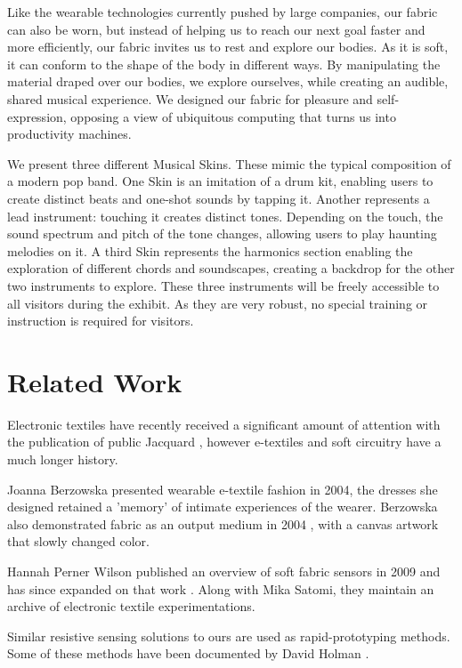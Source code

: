 \documentclass{sigchi-ext}
\begin{document}
Like the wearable technologies currently pushed by large companies, our fabric can also be worn, but instead of helping us to reach our next goal faster and more efficiently, our fabric invites us to rest and explore our bodies. As it is soft, it can conform to the shape of the body in different ways. By manipulating the material draped over our bodies, we explore ourselves, while creating an audible, shared musical experience. We designed our fabric for pleasure and self-expression, opposing a view of ubiquitous computing that turns us into productivity machines.

We present three different Musical Skins. These mimic the typical composition of a modern pop band. One Skin is an imitation of a drum kit, enabling users to create distinct beats and one-shot sounds by tapping it. Another represents a lead instrument: touching it creates distinct tones. Depending on the touch, the sound spectrum and pitch of the tone changes, allowing users to play haunting melodies on it. A third Skin represents the harmonics section enabling the exploration of different chords and soundscapes, creating a backdrop for the other two instruments to explore. These three instruments will be freely accessible to all visitors during the exhibit. As they are very robust, no special training or instruction is required for visitors.


\section{Related Work}
Electronic textiles have recently received a significant amount of attention with the publication of public Jacquard \cite{jacquard}, however e-textiles and soft circuitry have a much longer history.

Joanna Berzowska presented wearable e-textile fashion in 2004\cite{berzowska:04}, the dresses she designed retained a 'memory' of intimate experiences of the wearer. Berzowska also demonstrated fabric as an output medium in 2004 \cite{berzowska:05} , with a canvas artwork that slowly changed color.

Hannah Perner Wilson published an overview of soft fabric sensors in 2009 \cite{perner-wilson:09} and has since expanded on that work \cite{perner-wilson:10}. Along with Mika Satomi, they maintain an archive of electronic textile experimentations\cite{kobakant}.

Similar resistive sensing solutions to ours are used as rapid-prototyping methods. Some of these methods have been documented by David Holman \cite{holman:14, holman:11}.
\end{document}
